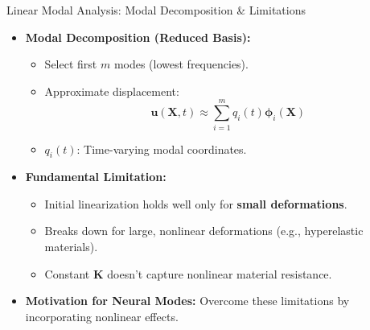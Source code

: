 \documentclass{beamer}
\begin{document}
\begin{frame}{Linear Modal Analysis: Modal Decomposition \& Limitations}
    \begin{itemize}
        \item \textbf{Modal Decomposition (Reduced Basis):}
        \begin{itemize}
            \item Select first \(m\) modes (lowest frequencies).
            \item Approximate displacement:
            \begin{equation*}
                \bm{u}(\bm{X},t) \approx \sum_{i=1}^{m} q_i(t) \bm{\phi}_i(\bm{X})
            \end{equation*}
            \item \(q_i(t)\): Time-varying modal coordinates.
        \end{itemize}
        \item \textbf{Fundamental Limitation:}
        \begin{itemize}
            \item Initial linearization holds well only for \textbf{small deformations}.
            \item Breaks down for large, nonlinear deformations (e.g., hyperelastic materials).
            \item Constant \(\bm{K}\) doesn't capture nonlinear material resistance.
        \end{itemize}
        \item \textbf{Motivation for Neural Modes:} Overcome these limitations by incorporating nonlinear effects.
    \end{itemize}
\end{frame}
\end{document}
